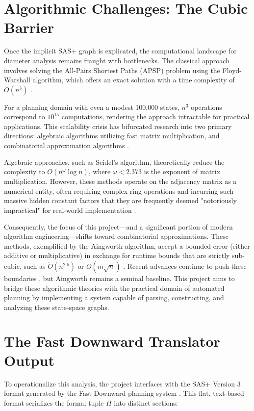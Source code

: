 \documentclass[12pt,a4paper]{report}
\begin{document}
\section{Algorithmic Challenges: The Cubic Barrier}
Once the implicit SAS+ graph is explicated, the computational landscape for diameter analysis remains fraught with bottlenecks. The classical approach involves solving the All-Pairs Shortest Paths (APSP) problem using the Floyd-Warshall algorithm, which offers an exact solution with a time complexity of $O(n^3)$ \cite{ecealgo}.

For a planning domain with even a modest 100,000 states, $n^3$ operations correspond to $10^{15}$ computations, rendering the approach intractable for practical applications. This scalability crisis has bifurcated research into two primary directions: algebraic algorithms utilizing fast matrix multiplication, and combinatorial approximation algorithms \cite{siam}.

Algebraic approaches, such as Seidel’s algorithm, theoretically reduce the complexity to $O(n^{\omega} \log n)$, where $\omega < 2.373$ is the exponent of matrix multiplication. However, these methods operate on the adjacency matrix as a numerical entity, often requiring complex ring operations and incurring such massive hidden constant factors that they are frequently deemed "notoriously impractical" for real-world implementation \cite{cmuSeidel}.

Consequently, the focus of this project—and a significant portion of modern algorithm engineering—shifts toward combinatorial approximations. These methods, exemplified by the Aingworth algorithm, accept a bounded error (either additive or multiplicative) in exchange for runtime bounds that are strictly sub-cubic, such as $\tilde{O}(n^{2.5})$ or $O(m\sqrt{n})$ \cite{aingworth96}. Recent advances continue to push these boundaries \cite{arxiv2025}, but Aingworth remains a seminal baseline. This project aims to bridge these algorithmic theories with the practical domain of automated planning by implementing a system capable of parsing, constructing, and analyzing these state-space graphs.

\section{The Fast Downward Translator Output}
To operationalize this analysis, the project interfaces with the SAS+ Version 3 format generated by the Fast Downward planning system \cite{fastdownward, sasdocs}. This flat, text-based format serializes the formal tuple $\Pi$ into distinct sections:
\end{document}
